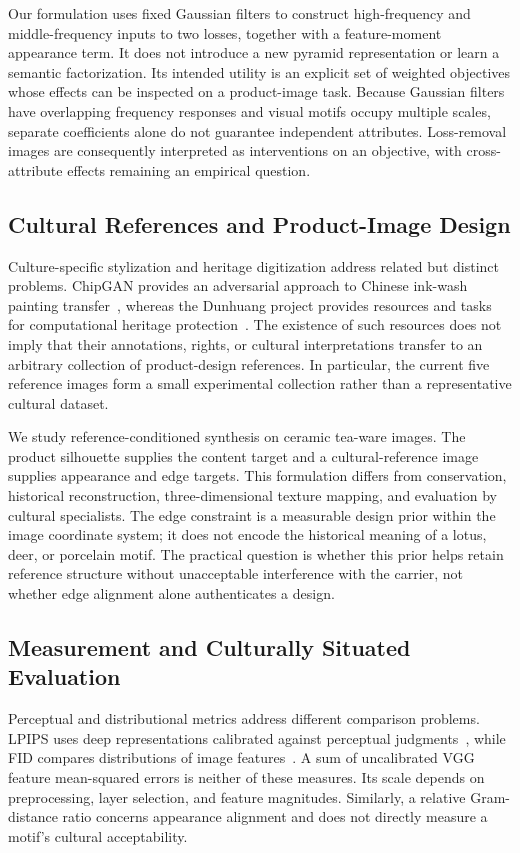 Our formulation uses fixed Gaussian filters to construct high-frequency and middle-frequency inputs to two losses, together with a feature-moment appearance term. It does not introduce a new pyramid representation or learn a semantic factorization. Its intended utility is an explicit set of weighted objectives whose effects can be inspected on a product-image task. Because Gaussian filters have overlapping frequency responses and visual motifs occupy multiple scales, separate coefficients alone do not guarantee independent attributes. Loss-removal images are consequently interpreted as interventions on an objective, with cross-attribute effects remaining an empirical question.

\subsection{Cultural References and Product-Image Design}
Culture-specific stylization and heritage digitization address related but distinct problems. ChipGAN provides an adversarial approach to Chinese ink-wash painting transfer~\cite{he2018}, whereas the Dunhuang project provides resources and tasks for computational heritage protection~\cite{yu2022}. The existence of such resources does not imply that their annotations, rights, or cultural interpretations transfer to an arbitrary collection of product-design references. In particular, the current five reference images form a small experimental collection rather than a representative cultural dataset.

We study reference-conditioned synthesis on ceramic tea-ware images. The product silhouette supplies the content target and a cultural-reference image supplies appearance and edge targets. This formulation differs from conservation, historical reconstruction, three-dimensional texture mapping, and evaluation by cultural specialists. The edge constraint is a measurable design prior within the image coordinate system; it does not encode the historical meaning of a lotus, deer, or porcelain motif. The practical question is whether this prior helps retain reference structure without unacceptable interference with the carrier, not whether edge alignment alone authenticates a design.

\subsection{Measurement and Culturally Situated Evaluation}
Perceptual and distributional metrics address different comparison problems. LPIPS uses deep representations calibrated against perceptual judgments~\cite{zhang2018lpips}, while FID compares distributions of image features~\cite{heusel2017fid}. A sum of uncalibrated VGG feature mean-squared errors is neither of these measures. Its scale depends on preprocessing, layer selection, and feature magnitudes. Similarly, a relative Gram-distance ratio concerns appearance alignment and does not directly measure a motif's cultural acceptability.

